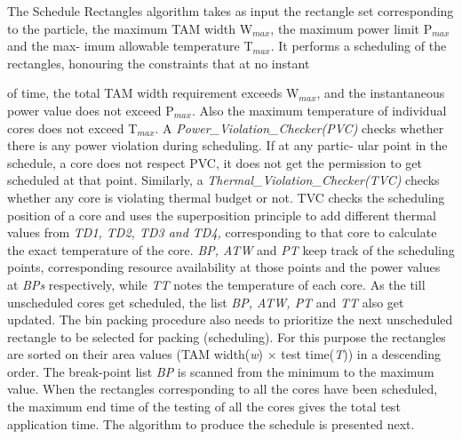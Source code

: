 \documentclass[conference]{IEEEtran}
\begin{document}
The Schedule Rectangles algorithm takes as input the
rectangle set corresponding to the particle, the maximum TAM
width W$_{max}$, the maximum power limit P$_{max}$ and the max-
imum allowable temperature T$_{max}$. It performs a scheduling
of the rectangles, honouring the constraints that at no instant

of time, the total TAM width requirement exceeds W$_{max}$, and
the instantaneous power value does not exceed P$_{max}$. Also
the maximum temperature of individual cores does not exceed
T$_{max}$. A \textit{Power\_Violation\_Checker(PVC)} checks whether
there is any power violation during scheduling. If at any partic-
ular point in the schedule, a core does not respect PVC, it does
not get the permission to get scheduled at that point. Similarly,
a \textit{Thermal\_Violation\_Checker(TVC)} checks whether any
core is violating thermal budget or not. TVC checks the
scheduling position of a core and uses the superposition
principle to add different thermal values from \textit{TD1, TD2,
TD3 and TD4,} corresponding to that core to calculate the
exact temperature of the core. \textit{BP, ATW} and \textit{PT} keep track
of the scheduling points, corresponding resource availability at
those points and the power values at \textit{BPs} respectively, while
\textit{TT} notes the temperature of each core. As the till unscheduled
cores get scheduled, the list \textit{BP, ATW, PT} and \textit{TT} also get
updated. The bin packing procedure also needs to prioritize
the next unscheduled rectangle to be selected for packing
(scheduling). For this purpose the rectangles are sorted on their
area values (TAM width(\textit{w}) × test time(\textit{T})) in a descending
order. The break-point list \textit{BP} is scanned from the minimum
to the maximum value. When the rectangles corresponding to
all the cores have been scheduled, the maximum end time of
the testing of all the cores gives the total test application time.
The algorithm to produce the schedule is presented next.
\end{document}
